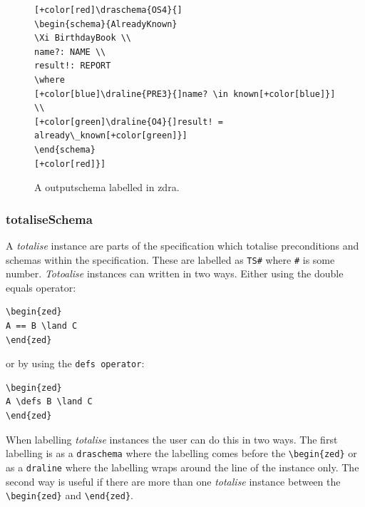 \begin{figure}[H]
\centering
\begin{footnotesize}
\begin{BVerbatim}[commandchars=+\[\]] [+color[red]\draschema{OS4}{]
\begin{schema}{AlreadyKnown}
\Xi BirthdayBook \\
name?: NAME \\
result!: REPORT
\where
[+color[blue]\draline{PRE3}{]name? \in known[+color[blue]}] \\
[+color[green]\draline{O4}{]result! = already\_known[+color[green]}]
\end{schema}
[+color[red]}]
\end{BVerbatim}
\end{footnotesize}
\caption{\label{fig:exampleofos} A outputschema labelled in \gls{zdra}.}
\end{figure}

\subsubsection{totaliseSchema}

A \emph{totalise} instance are parts of the specification which totalise
preconditions and schemas within the specification. These are labelled as
\verb|TS#| where \verb|#| is some number. \emph{Totoalise} instances can written
in two ways. Either using the double equals operator:

\begin{verbatim}
\begin{zed}
A == B \land C
\end{zed}
\end{verbatim}

or by using the \verb|defs operator|:

\begin{verbatim}
\begin{zed}
A \defs B \land C
\end{zed}
\end{verbatim}

When labelling \emph{totalise} instances the user can do this in two ways. The
first labelling is as a \verb|draschema| where the labelling comes before the
\verb|\begin{zed}| or as a \verb|draline| where the labelling wraps around the
line of the instance only. The second way is useful if there are more than one
\emph{totalise} instance between the \verb|\begin{zed}| and \verb|\end{zed}|. 

